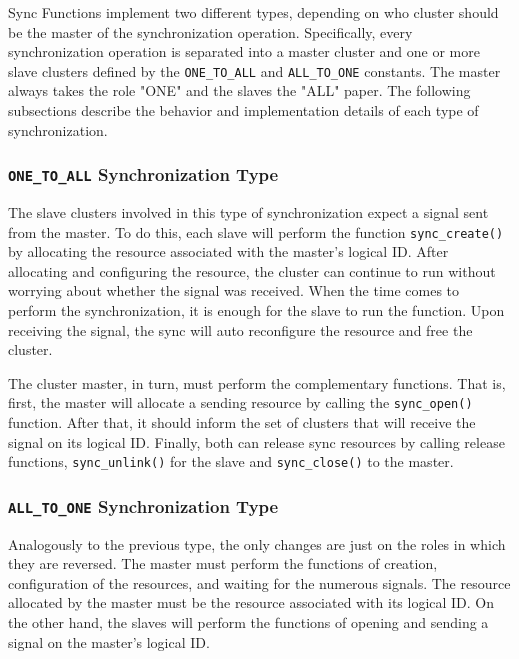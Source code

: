 		Sync Functions implement two different types, depending on who cluster
		should be the master of the synchronization operation.
		Specifically, every synchronization operation is separated into a
		master cluster and one or more slave clusters defined by the
		\texttt{ONE\_TO\_ALL} and \texttt{ALL\_TO\_ONE} constants.
		The master always takes the role "ONE" and the slaves the "ALL" paper.
		The following subsections describe the behavior and implementation
		details of each type of synchronization.

			\subsubsection*{\texttt{ONE\_TO\_ALL} Synchronization Type}

				The slave clusters involved in this type of synchronization expect
				a signal sent from the master.
				To do this, each slave will perform the function \texttt{sync\_create()}
				by allocating the resource associated with the master's logical ID.
				After allocating and configuring the resource, the cluster can
				continue to run without worrying about whether the signal was received.
				When the time comes to perform the synchronization, it is enough for
				the slave to run the function.
				Upon receiving the signal, the sync will auto reconfigure the resource
				and free the cluster.

				The cluster master, in turn, must perform the complementary functions.
				That is, first, the master will allocate a sending resource by calling
				the \texttt{sync\_open()} function.
				After that, it should inform the set of clusters that will receive the
				signal on its logical ID.
				Finally, both can release sync resources by calling release functions,
				\texttt{sync\_unlink()} for the slave and \texttt{sync\_close()} to
				the master.

			\subsubsection*{\texttt{ALL\_TO\_ONE} Synchronization Type}

				Analogously to the previous type, the only changes are just on
				the roles in which they are reversed.
				The master must perform the functions of creation, configuration
				of the resources, and waiting for the numerous signals.
				The resource allocated by the master must be the resource
				associated with its logical ID.
				On the other hand, the slaves will perform the functions of
				opening and sending a signal on the master's logical ID.

